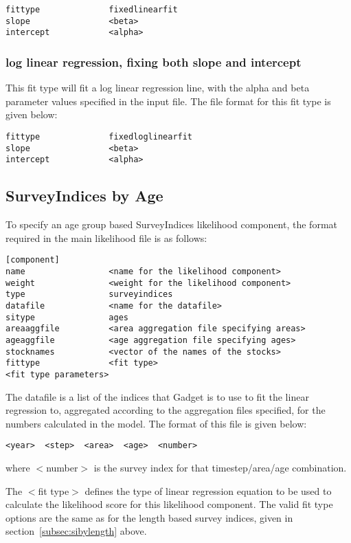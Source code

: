 \documentclass[10pt,twoside]{book}
\begin{document}
{\small\begin{verbatim}
fittype              fixedlinearfit
slope                <beta>
intercept            <alpha>
\end{verbatim}}

\subsubsection{log linear regression, fixing both slope and intercept}
This fit type will fit a log linear regression line, with the alpha and beta parameter values specified in the input file.  The file format for this fit type is given below:

{\small\begin{verbatim}
fittype              fixedloglinearfit
slope                <beta>
intercept            <alpha>
\end{verbatim}}

\subsection{SurveyIndices by Age}\label{subsec:sibyage}
To specify an age group based SurveyIndices likelihood component, the format required in the main likelihood file is as follows:

{\small\begin{verbatim}
[component]
name                 <name for the likelihood component>
weight               <weight for the likelihood component>
type                 surveyindices
datafile             <name for the datafile>
sitype               ages
areaaggfile          <area aggregation file specifying areas>
ageaggfile           <age aggregation file specifying ages>
stocknames           <vector of the names of the stocks>
fittype              <fit type>
<fit type parameters>
\end{verbatim}}

The datafile is a list of the indices that Gadget is to use to fit the linear regression to, aggregated according to the aggregation files specified, for the numbers calculated in the model.  The format of this file is given below:

{\small\begin{verbatim}
<year>  <step>  <area>  <age>  <number>
\end{verbatim}}

where $<$number$>$ is the survey index for that timestep/area/age combination.

\bigskip
The $<$fit type$>$ defines the type of linear regression equation to be used to calculate the likelihood score for this likelihood component.  The valid fit type options are the same as for the length based survey indices, given in section~\ref{subsec:sibylength} above.
\end{document}
